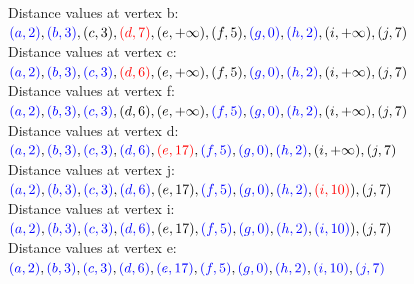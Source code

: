 \documentclass{article}
\begin{document}
Distance values at vertex b:\\
$\textcolor{blue}{(a, 2)}, \textcolor{blue}{(b, 3)}, (c, 3), \textcolor{red}{(d, 7)}, (e, + \infty), (f, 5), \textcolor{blue}{(g, 0)}, \textcolor{blue}{(h, 2)}, (i, + \infty), (j, 7)$\\

Distance values at vertex c:\\
$\textcolor{blue}{(a, 2)}, \textcolor{blue}{(b, 3)}, \textcolor{blue}{(c, 3)}, \textcolor{red}{(d, 6)}, (e, + \infty), (f, 5), \textcolor{blue}{(g, 0)}, \textcolor{blue}{(h, 2)}, (i, + \infty), (j, 7)$\\

Distance values at vertex f:\\
$\textcolor{blue}{(a, 2)}, \textcolor{blue}{(b, 3)}, \textcolor{blue}{(c, 3)}, (d, 6), (e, + \infty), \textcolor{blue}{(f, 5)}, \textcolor{blue}{(g, 0)}, \textcolor{blue}{(h, 2)}, (i, + \infty), (j, 7)$\\

Distance values at vertex d:\\
$\textcolor{blue}{(a, 2)}, \textcolor{blue}{(b, 3)}, \textcolor{blue}{(c, 3)}, \textcolor{blue}{(d, 6)}, \textcolor{red}{(e, 17)}, \textcolor{blue}{(f, 5)}, \textcolor{blue}{(g, 0)}, \textcolor{blue}{(h, 2)}, (i, + \infty), (j, 7)$\\

Distance values at vertex j:\\
$\textcolor{blue}{(a, 2)}, \textcolor{blue}{(b, 3)}, \textcolor{blue}{(c, 3)}, \textcolor{blue}{(d, 6)}, (e, 17), \textcolor{blue}{(f, 5)}, \textcolor{blue}{(g, 0)}, \textcolor{blue}{(h, 2)}, \textcolor{red}{(i, 10)}), (j, 7)$\\

Distance values at vertex i:\\
$\textcolor{blue}{(a, 2)}, \textcolor{blue}{(b, 3)}, \textcolor{blue}{(c, 3)}, \textcolor{blue}{(d, 6)}, (e, 17), \textcolor{blue}{(f, 5)}, \textcolor{blue}{(g, 0)}, \textcolor{blue}{(h, 2)}, \textcolor{blue}{(i, 10)}), (j, 7)$\\

Distance values at vertex e:\\
$\textcolor{blue}{(a, 2)}, \textcolor{blue}{(b, 3)}, \textcolor{blue}{(c, 3)}, \textcolor{blue}{(d, 6)}, \textcolor{blue}{(e, 17)}, \textcolor{blue}{(f, 5)}, \textcolor{blue}{(g, 0)}, \textcolor{blue}{(h, 2)}, \textcolor{blue}{(i, 10)}, \textcolor{blue}{(j, 7)}$\\
\end{document}
